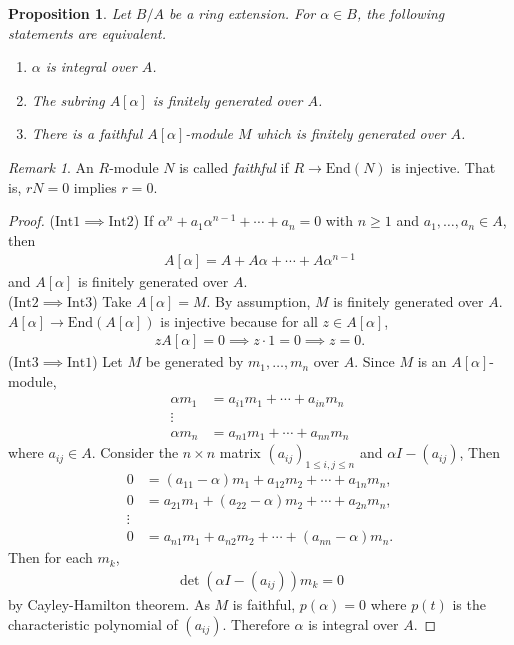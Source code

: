 \documentclass[12pt]{report}
\theoremstyle{plain}
\newtheorem{proposition}[theorem]{Proposition}
\theoremstyle{remark}
\newtheorem*{remark}{Remark}
\theoremstyle{definition}
\begin{document}
\begin{proposition}
    Let $B/A$ be a ring extension. For $\alpha\in B$, the following statements are equivalent.
    \begin{enumerate}[label=Int\arabic*)]
        \item $\alpha$ is integral over $A$.
        \item The subring $A[\alpha]$ is finitely generated over $A$.
        \item There is a faithful $A[\alpha]$-module $M$ which is finitely generated over $A$.
    \end{enumerate}
\end{proposition}
\begin{remark}
    An $R$-module $N$ is called \emph{faithful} if $R\to\mathrm{End}(N)$ is injective. That is, $rN=0$ implies $r=0$.
\end{remark}
\begin{proof}
    ($\mathrm{Int}1\implies \mathrm{Int}2$) If $\alpha^n+a_1\alpha^{n-1}+\cdots+a_n=0$ with $n\ge 1$ and $a_1,\dots,a_n\in A$, then
    \begin{align*}
        A[\alpha]=A+A\alpha+\cdots+A\alpha^{n-1}
    \end{align*}
    and $A[\alpha]$ is finitely generated over $A$. \\
    ($\mathrm{Int}2\implies \mathrm{Int}3$) Take $A[\alpha]=M$. By assumption, $M$ is finitely generated over $A$. $A[\alpha]\to \mathrm{End}(A[\alpha])$ is injective because for all $z\in A[\alpha]$,
    \begin{align*}
        zA[\alpha]=0\implies z\cdot 1=0\implies z=0.
    \end{align*}
    ($\mathrm{Int}3\implies\mathrm{Int}1$) Let $M$ be generated by $m_1,\dots,m_n$ over $A$. Since $M$ is an $A[\alpha]$-module,
    \begin{align*}
        \alpha m_1 &= a_{i1}m_1+\cdots+a_{in}m_n \\
        \vdots \\
        \alpha m_n &= a_{n1}m_1+\cdots+a_{nn}m_n
    \end{align*}
    where $a_{ij}\in A$. Consider the $n\times n$ matrix $(a_{ij})_{1\le i,j\le n}$ and $\alpha I-(a_{ij})$, Then
    \begin{align*}
        0&=(a_{11}-\alpha)m_1+a_{12}m_2+\cdots+a_{1n}m_n, \\
        0&= a_{21}m_1+(a_{22}-\alpha)m_2+\cdots+a_{2n}m_n, \\
        \vdots \\
        0&= a_{n1}m_1+a_{n2}m_2+\cdots + (a_{nn}-\alpha)m_n.
    \end{align*}
    Then for each $m_k$,
    \begin{align*}
        \det(\alpha I - (a_{ij}))m_k=0
    \end{align*}
    by Cayley-Hamilton theorem. As $M$ is faithful, $p(\alpha)=0$ where $p(t)$ is the characteristic polynomial of $(a_{ij})$. Therefore $\alpha$ is integral over $A$.
\end{proof}
\end{document}
